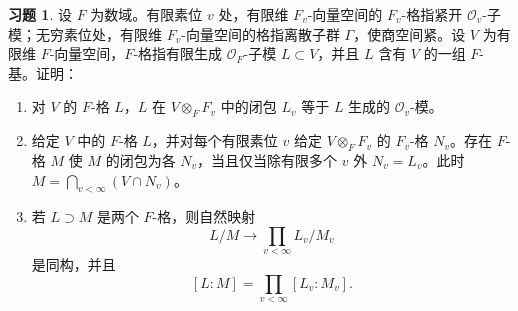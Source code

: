 \documentclass[11pt,a4paper,openany]{ctexbook}
\numberwithin{equation}{chapter}
\theoremstyle{plain}
\theoremstyle{definition}
\newtheorem{exercise}[theorem]{习题}
\theoremstyle{remark}
\begin{document}
\begin{exercise}
设 $F$ 为数域。有限素位 $v$ 处，有限维 $F_v$-向量空间的 $F_v$-格指紧开 $\mathcal O_v$-子模；无穷素位处，有限维 $F_v$-向量空间的格指离散子群 $\Gamma$，使商空间紧。设 $V$ 为有限维 $F$-向量空间，$F$-格指有限生成 $\mathcal O_F$-子模 $L\subset V$，并且 $L$ 含有 $V$ 的一组 $F$-基。证明：
\begin{enumerate}[label=(\arabic*)]
\item 对 $V$ 的 $F$-格 $L$，$L$ 在 $V\otimes_FF_v$ 中的闭包 $L_v$ 等于 $L$ 生成的 $\mathcal O_v$-模。
\item 给定 $V$ 中的 $F$-格 $L$，并对每个有限素位 $v$ 给定 $V\otimes_FF_v$ 的 $F_v$-格 $N_v$。存在 $F$-格 $M$ 使 $M$ 的闭包为各 $N_v$，当且仅当除有限多个 $v$ 外 $N_v=L_v$。此时 $M=\bigcap_{v<\infty}(V\cap N_v)$。
\item 若 $L\supset M$ 是两个 $F$-格，则自然映射
\[
 L/M\longrightarrow\prod_{v<\infty}L_v/M_v
\]
是同构，并且
\[
 [L:M]=\prod_{v<\infty}[L_v:M_v].
\]
\end{enumerate}
\end{exercise}
\end{document}
